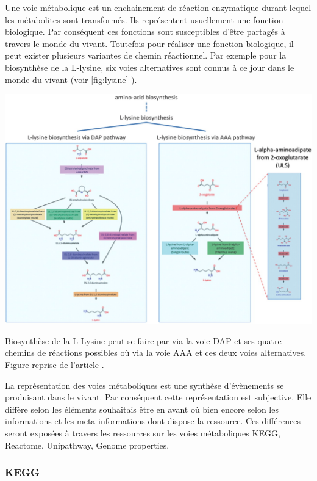 \begin{refsegment}
    Une voie métabolique est un enchainement de réaction enzymatique durant lequel les métabolites sont transformés. Ils représentent usuellement une fonction biologique. Par conséquent ces fonctions sont susceptibles d'être partagés à travers le monde du vivant. Toutefois pour réaliser une fonction biologique, il peut exister plusieurs variantes de chemin réactionnel. Par exemple pour la biosynthèse de la L-lysine, six voies alternatives sont connus à ce jour dans le monde du vivant (voir \cref{fig:lysine} ).
    	
    	
    	\begin{shadedfigure}[H]
    		\centering
    		\includegraphics[width=\textwidth]{img/L-lysine-biosynthesis.jpg}
    		\caption{Biosynthèse de la L-Lysine peut se faire par via la voie DAP et ses quatre chemins de réactions possibles où via la voie AAA et ces deux voies alternatives. Figure reprise de l'article . }
    		\label{fig:lysine}
    	\end{shadedfigure}
     
     La représentation des voies métaboliques est une synthèse d'évènements se produisant dans le vivant. Par conséquent cette représentation est subjective. Elle diffère selon les éléments souhaitais être en avant où bien encore selon les informations et les meta-informations dont dispose la ressource. Ces différences seront exposées à travers les ressources sur les voies métaboliques KEGG, Reactome, Unipathway, Genome properties.
     
    \subsubsection{KEGG}
    

\end{refsegment}
